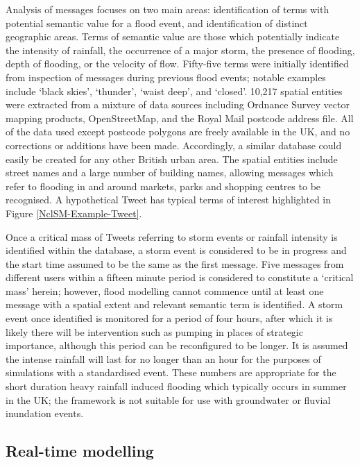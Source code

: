 Analysis of messages focuses on two main areas: identification of terms with potential semantic value for a flood event, and identification of distinct geographic areas. Terms of semantic value are those which potentially indicate the intensity of rainfall, the occurrence of a major storm, the presence of flooding, depth of flooding, or the velocity of flow. Fifty-five terms were initially identified from inspection of messages during previous flood events; notable examples include `black skies', `thunder', `waist deep', and `closed'.  10,217 spatial entities were extracted from a mixture of data sources including Ordnance Survey vector mapping products, OpenStreetMap, and the Royal Mail postcode address file. All of the data used except postcode polygons are freely available in the UK, and no corrections or additions have been made. Accordingly, a similar database could easily be created for any other British urban area. The spatial entities include street names and a large number of building names, allowing messages which refer to flooding in and around markets, parks and shopping centres to be recognised. A hypothetical Tweet has typical terms of interest highlighted in Figure \ref{NclSM-Example-Tweet}.

Once a critical mass of Tweets referring to storm events or rainfall intensity is identified within the database, a storm event is considered to be in progress and the start time assumed to be the same as the first message. Five messages from different users within a fifteen minute period is considered to constitute a `critical mass' herein; however, flood modelling cannot commence until at least one message with a spatial extent and relevant semantic term is identified. A storm event once identified is monitored for a period of four hours, after which it is likely there will be intervention such as pumping in places of strategic importance, although this period can be reconfigured to be longer. It is assumed the intense rainfall will last for no longer than an hour for the purposes of simulations with a standardised event. These numbers are appropriate for the short duration heavy rainfall induced flooding which typically occurs in summer in the UK; the framework is not suitable for use with groundwater or fluvial inundation events.

\subsection{Real-time modelling}

